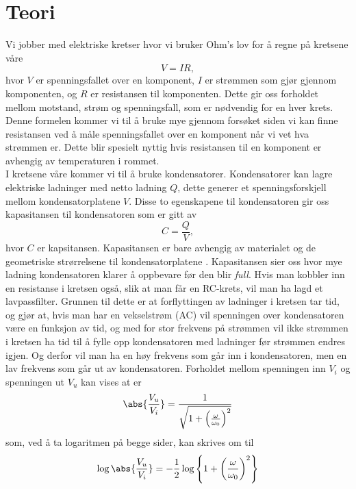 \documentclass[%
 reprint,
nofootinbib,
aps,
]{revtex4-1}
\begin{document}
\section{\label{teori}Teori}
Vi jobber med elektriske kretser hvor vi bruker Ohm's lov \cite{skaar} for å regne på kretsene våre
\begin{equation}
  V = IR \label{ohm},
\end{equation}
hvor $V$ er spenningsfallet over en komponent, $I$ er strømmen som gjør gjennom komponenten, og $R$ er resistansen til komponenten. Dette gir oss forholdet mellom motstand, strøm og spenningsfall, som er nødvendig for en hver krets. Denne formelen kommer vi til å bruke mye gjennom forsøket siden vi kan finne resistansen ved å måle spenningsfallet over en komponent når vi vet hva strømmen er. Dette blir spesielt nyttig hvis resistansen til en komponent er avhengig av temperaturen i rommet. \\
I kretsene våre kommer vi til å bruke kondensatorer. Kondensatorer kan lagre elektriske ladninger med netto ladning $Q$, dette generer et spenningsforskjell mellom kondensatorplatene $V$. Disse to egenskapene til kondensatoren gir oss kapasitansen til kondensatoren som er gitt av
\begin{equation}
  C = \frac{Q}{V},
\end{equation}
hvor $C$ er kapsitansen. Kapasitansen er bare avhengig av materialet og de geometriske strørrelsene til kondensatorplatene \cite{skaar}. Kapasitansen sier oss hvor mye ladning kondensatoren klarer å oppbevare før den blir \textit{full}. Hvis man kobbler inn en resistanse i kretsen også, slik at man får en RC-krets, vil man ha lagd et lavpassfilter. Grunnen til dette er at forflyttingen av ladninger i kretsen tar tid, og gjør at, hvis man har en vekselstrøm (AC) vil spenningen over kondensatoren være en funksjon av tid, og med for stor frekvens på strømmen vil ikke strømmen i kretsen ha tid til å fylle opp kondensatoren med ladninger før strømmen endres igjen. Og derfor vil man ha en høy frekvens som går inn i kondensatoren, men en lav frekvens som går ut av kondensatoren. Forholdet mellom spenningen inn $V_i$ og spenningen ut $V_u$ kan vises at \cite{oppgave} er
\begin{equation}
  \abs{\frac{V_u}{V_i}} = \frac{1}{\sqrt{1+\left(\frac{\omega}{\omega_0}\right)^2}}
\end{equation}som, ved å ta logaritmen på begge sider, kan skrives om til
\begin{equation}
  \log\abs{\frac{V_u}{V_i}} = -\frac{1}{2}\log\left\{1+\left(\frac{\omega}{\omega_0}\right)^2 \right\}
\end{equation}
\end{document}
